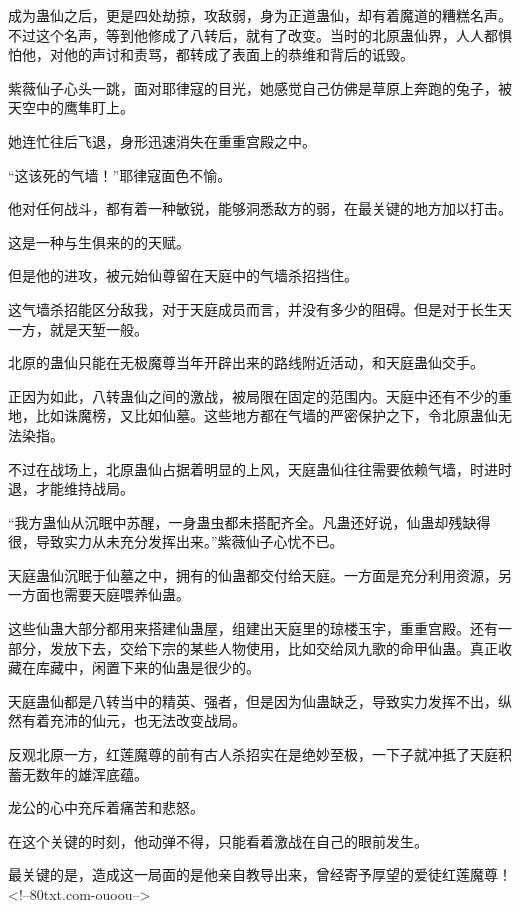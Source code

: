 \begin{this_body}
成为蛊仙之后，更是四处劫掠，攻敌弱，身为正道蛊仙，却有着魔道的糟糕名声。不过这个名声，等到他修成了八转后，就有了改变。当时的北原蛊仙界，人人都惧怕他，对他的声讨和责骂，都转成了表面上的恭维和背后的诋毁。

紫薇仙子心头一跳，面对耶律寇的目光，她感觉自己仿佛是草原上奔跑的兔子，被天空中的鹰隼盯上。

她连忙往后飞退，身形迅速消失在重重宫殿之中。

“这该死的气墙！”耶律寇面色不愉。

他对任何战斗，都有着一种敏锐，能够洞悉敌方的弱，在最关键的地方加以打击。

这是一种与生俱来的的天赋。

但是他的进攻，被元始仙尊留在天庭中的气墙杀招挡住。

这气墙杀招能区分敌我，对于天庭成员而言，并没有多少的阻碍。但是对于长生天一方，就是天堑一般。

北原的蛊仙只能在无极魔尊当年开辟出来的路线附近活动，和天庭蛊仙交手。

正因为如此，八转蛊仙之间的激战，被局限在固定的范围内。天庭中还有不少的重地，比如诛魔榜，又比如仙墓。这些地方都在气墙的严密保护之下，令北原蛊仙无法染指。

不过在战场上，北原蛊仙占据着明显的上风，天庭蛊仙往往需要依赖气墙，时进时退，才能维持战局。

“我方蛊仙从沉眠中苏醒，一身蛊虫都未搭配齐全。凡蛊还好说，仙蛊却残缺得很，导致实力从未充分发挥出来。”紫薇仙子心忧不已。

天庭蛊仙沉眠于仙墓之中，拥有的仙蛊都交付给天庭。一方面是充分利用资源，另一方面也需要天庭喂养仙蛊。

这些仙蛊大部分都用来搭建仙蛊屋，组建出天庭里的琼楼玉宇，重重宫殿。还有一部分，发放下去，交给下宗的某些人物使用，比如交给凤九歌的命甲仙蛊。真正收藏在库藏中，闲置下来的仙蛊是很少的。

天庭蛊仙都是八转当中的精英、强者，但是因为仙蛊缺乏，导致实力发挥不出，纵然有着充沛的仙元，也无法改变战局。

反观北原一方，红莲魔尊的前有古人杀招实在是绝妙至极，一下子就冲抵了天庭积蓄无数年的雄浑底蕴。

龙公的心中充斥着痛苦和悲怒。

在这个关键的时刻，他动弹不得，只能看着激战在自己的眼前发生。

最关键的是，造成这一局面的是他亲自教导出来，曾经寄予厚望的爱徒红莲魔尊！<!--80txt.com-ouoou-->

\end{this_body}

